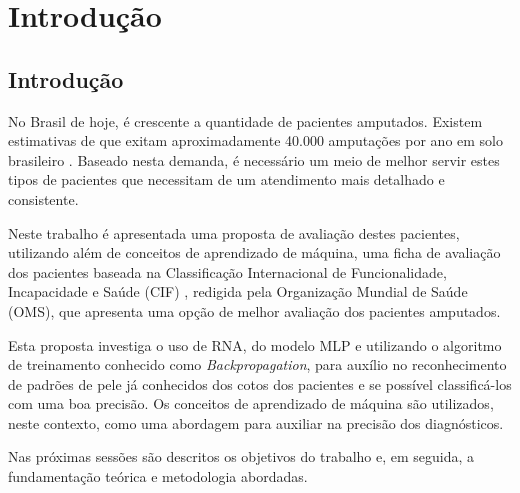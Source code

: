 \part{Introdução}
\chapter[Introdução]{Introdução}

No Brasil de hoje, é crescente a quantidade de pacientes amputados. Existem estimativas de que exitam aproximadamente 40.000 amputações por ano em solo brasileiro \cite{Reis2011}. Baseado nesta demanda, é necessário um meio de melhor servir estes tipos de pacientes que necessitam de um atendimento mais detalhado e consistente.

Neste trabalho é apresentada uma proposta de avaliação destes pacientes,  utilizando além de conceitos de aprendizado de máquina, uma ficha de avaliação dos pacientes baseada na Classificação Internacional de Funcionalidade, Incapacidade e Saúde (CIF) \cite{OMS2004}, redigida pela Organização Mundial de Saúde (OMS), que apresenta uma opção de melhor avaliação dos pacientes amputados.

Esta proposta investiga o uso de RNA, do modelo MLP e utilizando o algoritmo de treinamento conhecido como \textit{Backpropagation}, para auxílio no reconhecimento de padrões de pele já conhecidos dos cotos dos pacientes e se possível classificá-los com uma boa precisão. Os conceitos de aprendizado de máquina são utilizados, neste contexto, como uma abordagem para auxiliar na precisão dos diagnósticos.

Nas próximas sessões são descritos os objetivos do trabalho e, em seguida, a fundamentação teórica e metodologia abordadas.